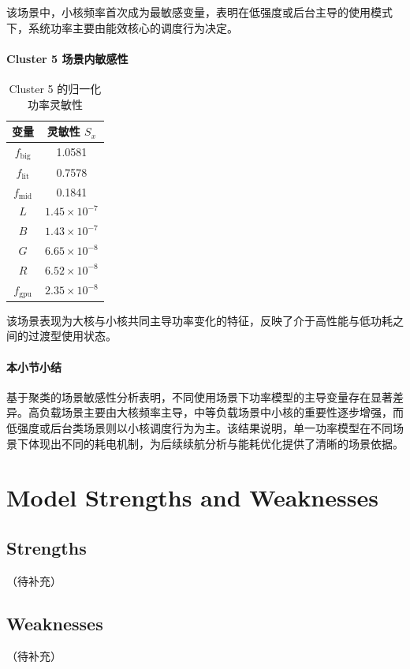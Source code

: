 \documentclass[11pt]{article}
\begin{document}
该场景中，小核频率首次成为最敏感变量，表明在低强度或后台主导的使用模式下，系统功率主要由能效核心的调度行为决定。


\paragraph{Cluster 5 场景内敏感性}

\begin{table}[H]
\centering
\caption{Cluster 5 的归一化功率灵敏性}
\begin{tabular}{cc}
\hline
变量 & 灵敏性 $S_x$ \\ \hline
$f_{\mathrm{big}}$ & 1.0581 \\
$f_{\mathrm{lit}}$ & 0.7578 \\
$f_{\mathrm{mid}}$ & 0.1841 \\
$L$ & $1.45\times10^{-7}$ \\
$B$ & $1.43\times10^{-7}$ \\
$G$ & $6.65\times10^{-8}$ \\
$R$ & $6.52\times10^{-8}$ \\
$f_{\mathrm{gpu}}$ & $2.35\times10^{-8}$ \\ \hline
\end{tabular}
\end{table}

该场景表现为大核与小核共同主导功率变化的特征，反映了介于高性能与低功耗之间的过渡型使用状态。


\paragraph{本小节小结}
基于聚类的场景敏感性分析表明，不同使用场景下功率模型的主导变量存在显著差异。高负载场景主要由大核频率主导，中等负载场景中小核的重要性逐步增强，而低强度或后台类场景则以小核调度行为为主。该结果说明，单一功率模型在不同场景下体现出不同的耗电机制，为后续续航分析与能耗优化提供了清晰的场景依据。


\section{Model Strengths and Weaknesses}
\subsection{Strengths}
（待补充）

\subsection{Weaknesses}
（待补充）
\end{document}

